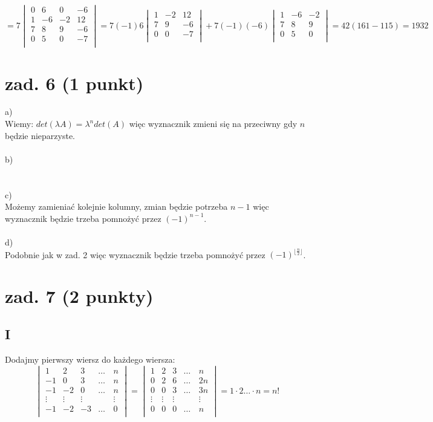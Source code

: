\documentclass{article}
\begin{document}
$$
=7
\begin{vmatrix}
0 & 6 & 0 & -6 \\
1 & -6 & -2 &  12 \\
7 & 8 & 9 & -6 \\
0 & 5 & 0 &  -7 \\
\end{vmatrix}
=7(-1)6
\begin{vmatrix}
1  & -2 &  12 \\
7  & 9 & -6 \\
0  & 0 &  -7 \\
\end{vmatrix} +
7(-1)(-6)
\begin{vmatrix}
1 & -6 & -2 \\
7 & 8 & 9 \\
0 & 5 & 0 \\
\end{vmatrix} = 42(161 - 115) = 1932
$$
\section{zad. 6 (1 punkt)}
a)\\
Wiemy: $det(\lambda A) = {\lambda}^n det(A)$ więc wyznacznik zmieni się na przeciwny gdy $n$ będzie nieparzyste.
\\\\b)\\
\\\\c)\\
Możemy zamieniać kolejnie kolumny, zmian będzie potrzeba $n -1$ więc wyznacznik będzie trzeba pomnożyć przez ${(-1)}^{n-1}$.
\\\\d)\\
Podobnie jak w zad. 2 więc wyznacznik będzie trzeba pomnożyć przez ${(-1)}^{\lfloor{\frac{n}{2}} \rfloor}$.
\section{zad. 7 (2 punkty)}
\subsection*{I}
Dodajmy pierwszy wiersz do każdego wiersza:
$$
\begin{vmatrix}
1 & 2 & 3 & \dots & n\\
-1 & 0 & 3 & \dots & n\\
-1 & -2 & 0 & \dots & n\\
\vdots & \vdots & \vdots & \quad &\vdots\\
-1 & -2 & -3 & \dots & 0\\
\end{vmatrix} = 
\begin{vmatrix}
1 & 2 & 3 & \dots & n\\
0 & 2 & 6 & \dots & 2n\\
0 & 0 & 3 & \dots & 3n\\
\vdots & \vdots & \vdots & \quad &\vdots\\
0 & 0 & 0 & \dots & n\\
\end{vmatrix} = 1 \cdot 2 \dots \cdot n = n!
$$
\end{document}
